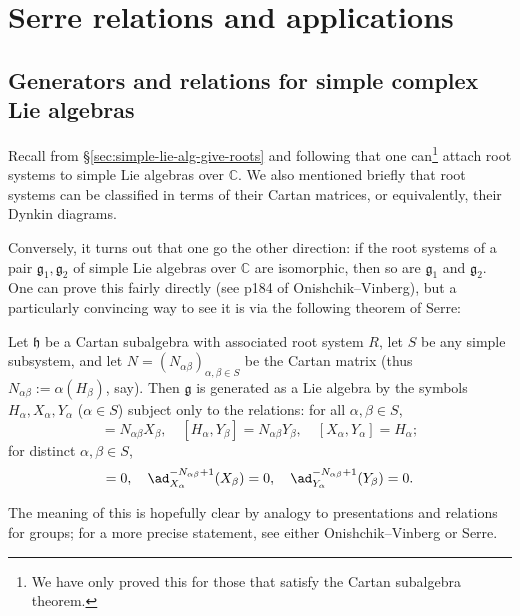 \documentclass[reqno]{amsart} 
\begin{document}
\section{Serre relations and applications}
\label{sec:org96d3081}

\subsection{Generators and relations for simple complex Lie algebras}
\label{sec:orgd6370a3}
Recall from \S\ref{sec:simple-lie-alg-give-roots} and following that one can\footnote{ We have only proved this for those that satisfy the Cartan subalgebra theorem.  } attach root systems to simple Lie algebras over $\mathbb{C}$.  We also mentioned briefly that root systems can be classified in terms of their Cartan matrices, or equivalently, their Dynkin diagrams.

Conversely, it turns out that one go the other direction: if the root systems of a pair $\mathfrak{g}_1, \mathfrak{g}_2$ of simple Lie algebras over $\mathbb{C}$ are isomorphic, then so are $\mathfrak{g}_1$ and $\mathfrak{g}_2$.  One can prove this fairly directly (see p184 of Onishchik--Vinberg), but a particularly convincing way to see it is via the following theorem of Serre:
\begin{theorem}\label{thm:serre-relations}
  Let $\mathfrak{h}$ be a Cartan subalgebra with associated root system $R$, let $S$ be any simple subsystem, and let $N = (N_{\alpha \beta})_{\alpha,\beta \in S}$ be the Cartan matrix (thus $N_{\alpha \beta} := \alpha(H_\beta)$, say).  Then $\mathfrak{g}$ is generated as a Lie algebra by the symbols $H_\alpha, X_\alpha, Y_\alpha$ ($\alpha \in S$) subject only to the relations: for all $\alpha,\beta \in S$,
  \begin{equation*}
 [H_\alpha,X_\beta] = N_{\alpha \beta} X_\beta, \quad [H_\alpha,Y_\beta] = N_{\alpha \beta} Y_\beta, \quad [X_\alpha,Y_\alpha] = H_\alpha;
  \end{equation*}
  for distinct $\alpha,\beta \in S$,
  \begin{equation*}
 [X_\alpha,Y_\beta] = 0, \quad \ad_{X_\alpha}^{-N_{\alpha \beta}+1}(X_\beta) = 0, \quad \ad_{Y_\alpha}^{-N_{\alpha \beta}+1}(Y_\beta) = 0.
  \end{equation*}
\end{theorem}
The meaning of this is hopefully clear by analogy to presentations and relations for groups; for a more precise statement, see either Onishchik--Vinberg or Serre.
\end{document}
